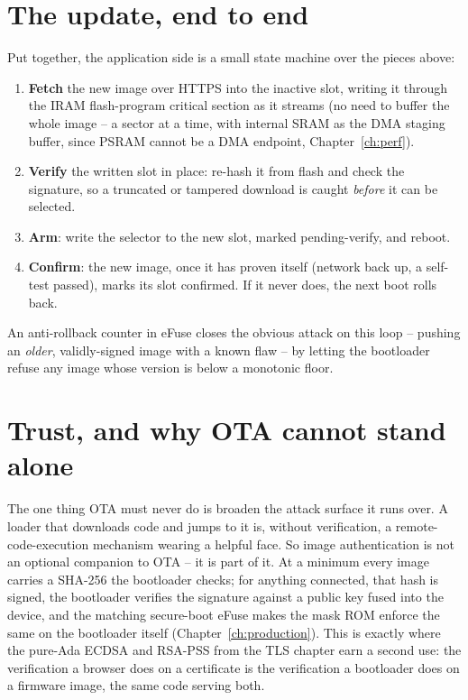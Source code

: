 \section{The update, end to end}

Put together, the application side is a small state machine over the pieces above:

\begin{enumerate}
\item \textbf{Fetch} the new image over HTTPS into the inactive slot, writing it
  through the IRAM flash-program critical section as it streams (no need to buffer
  the whole image -- a sector at a time, with internal SRAM as the DMA staging
  buffer, since PSRAM cannot be a DMA endpoint, Chapter~\ref{ch:perf}).
\item \textbf{Verify} the written slot in place: re-hash it from flash and check the
  signature, so a truncated or tampered download is caught \emph{before} it can be
  selected.
\item \textbf{Arm}: write the selector to the new slot, marked pending-verify, and
  reboot.
\item \textbf{Confirm}: the new image, once it has proven itself (network back up, a
  self-test passed), marks its slot confirmed. If it never does, the next boot
  rolls back.
\end{enumerate}

An anti-rollback counter in eFuse closes the obvious attack on this loop -- pushing
an \emph{older}, validly-signed image with a known flaw -- by letting the bootloader
refuse any image whose version is below a monotonic floor.

\section{Trust, and why OTA cannot stand alone}\label{ota:trust}

The one thing OTA must never do is broaden the attack surface it runs over. A loader
that downloads code and jumps to it is, without verification, a remote-code-execution
mechanism wearing a helpful face. So image authentication is not an optional
companion to OTA -- it is part of it. At a minimum every image carries a SHA-256 the
bootloader checks; for anything connected, that hash is signed, the bootloader
verifies the signature against a public key fused into the device, and the matching
secure-boot eFuse makes the mask ROM enforce the same on the bootloader itself
(Chapter~\ref{ch:production}). This is exactly where the pure-Ada ECDSA and RSA-PSS
from the TLS chapter earn a second use: the verification a browser does on a
certificate is the verification a bootloader does on a firmware image, the same code
serving both.

